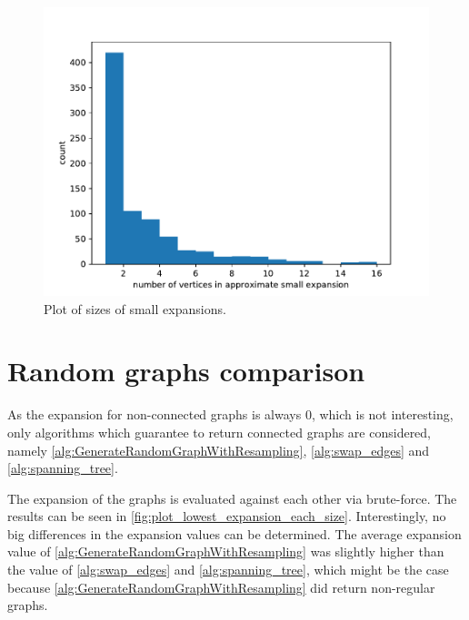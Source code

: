 \begin{figure}
	\centering
	\includegraphics[scale=1]{figures/quality_evaluation_log_small_expansion_sizes.pdf}
	\caption[Plot sizes small expansions]{Plot of sizes of small expansions.\label{fig:sizes_small_expansions}}
\end{figure}


\section{Random graphs comparison}
As the expansion for non-connected graphs is always $0$, which is not interesting, only algorithms which guarantee to return connected graphs are considered, namely \ref{alg:GenerateRandomGraphWithResampling}, \ref{alg:swap_edges} and \ref{alg:spanning_tree}.

The expansion of the graphs is evaluated against each other via brute-force. The results can be seen in \cref{fig:plot_lowest_expansion_each_size}. Interestingly, no big differences in the expansion values can be determined. The average expansion value of \ref{alg:GenerateRandomGraphWithResampling} was slightly higher than the value of \ref{alg:swap_edges} and \ref{alg:spanning_tree}, which might be the case because \ref{alg:GenerateRandomGraphWithResampling} did return non-regular graphs.


